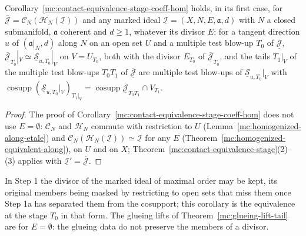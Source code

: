 \begin{corollary}
\label{mc:contact-equivalence-stage-coeff-hom-divisor}
\leanok
Corollary~\ref{mc:contact-equivalence-stage-coeff-hom} holds, in its first case, for \(\overline{\underline{\mathcal J}}=\mathcal C_N(\mathcal H_N(\underline{\mathcal I}))\) and any marked ideal
\(\underline{\mathcal I}=(X,N,E,\mathfrak a,d)\) with \(N\) a closed submanifold, \(\mathfrak a\) coherent and \(d\ge1\), whatever its divisor \(E\): for a tangent direction \(u\) of
\((\mathfrak a|_N,d)\) along \(N\) on an open set \(U\) and a multiple test blow-up \(T_0\) of \(\overline{\underline{\mathcal J}}\),
\(\overline{\underline{\mathcal J}}_{T_0}|_V\simeq\underline{\mathcal S}_{u,T_0}|_V\) on \(V=U_{T_0}\), both with the divisor \(E_{T_0}\) of \(\overline{\underline{\mathcal J}}_{T_0}\), and the tails
\(T_1|_V\) of the multiple test blow-ups \(T_0T_1\) of \(\overline{\underline{\mathcal J}}\) are multiple test blow-ups of \(\underline{\mathcal S}_{u,T_0}|_V\) with
\(\operatorname{cosupp}(\underline{\mathcal S}_{u,T_0}|_V)_{T_1|_V}=\operatorname{cosupp}\overline{\underline{\mathcal J}}_{T_0T_1}\cap V_{T_1}\).
\end{corollary}
\begin{proof}
\leanok
The proof of Corollary~\ref{mc:contact-equivalence-stage-coeff-hom} does not use \(E=\emptyset\): \(\mathcal C_N\) and \(\mathcal H_N\) commute with restriction to \(U\)
(Lemma~\ref{mc:homogenized-along-etale}) and \(\mathcal C_N(\mathcal H_N(\underline{\mathcal I}))\simeq\underline{\mathcal I}\) for any \(E\) (Theorem~\ref{mc:homogenized-equivalent-along}), on
\(U\) and on \(X\); Theorem~\ref{mc:contact-equivalence-stage}(2)--(3) applies with \(\underline{\mathcal I}'=\overline{\underline{\mathcal J}}\).
\end{proof}
In Step 1 the divisor of the marked ideal of maximal order may be kept, its original members being masked by restricting to open sets that miss them once
Step 1a has separated them from the cosupport; this corollary is the equivalence at the stage \(T_0\) in that form. The glueing lifts of
Theorem~\ref{mc:glueing-lift-tail} are for \(E=\emptyset\): the glueing data do not preserve the members of a divisor.

